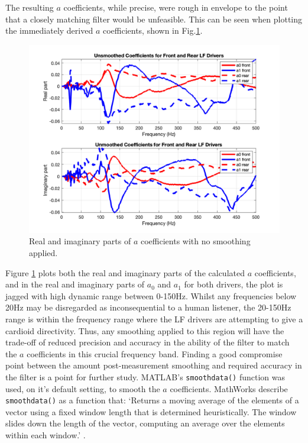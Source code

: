 \documentclass{report}
\begin{document}
            The resulting $a$ coefficients, while precise, were rough in envelope to the point that a closely matching filter would be unfeasible.
            This can be seen when plotting the immediately derived $a$ coefficients, shown in Fig.\ref{acoeffsNoSmooth}.
            \begin{figure}[H]
                \centering
                \includegraphics[scale=0.35]{figs/acoeffsNoSmooth.png}%
                \caption{Real and imaginary parts of $a$ coefficients with no smoothing applied.}
                \label{acoeffsNoSmooth}
            \end{figure}
            Figure \ref{acoeffsNoSmooth} plots both the real and imaginary parts of the calculated $a$ coefficients, and in the real and imaginary parts of $a_0$ and $a_1$ for both drivers, the plot is jagged with high dynamic range between 0-150Hz.
            Whilst any frequencies below 20Hz may be disregarded as inconsequential to a human listener, the 20-150Hz range is within the frequency range where the LF drivers are attempting to give a cardioid directivity.
            Thus, any smoothing applied to this region will have the trade-off of reduced precision and accuracy in the ability of the filter to match the $a$ coefficients in this crucial frequency band.
            Finding a good compromise point between the amount post-measurement smoothing and required accuracy in the filter is a point for further study.
            MATLAB's \texttt{smoothdata()} function was used, on it's default setting, to smooth the $a$ coefficients.
            MathWorks describe \texttt{smoothdata()} as a function that: `Returns a moving average of the elements of a vector using a fixed window length that is determined heuristically. The window slides down the length of the vector, computing an average over the elements within each window.' \cite{smoothdata}.
\end{document}
